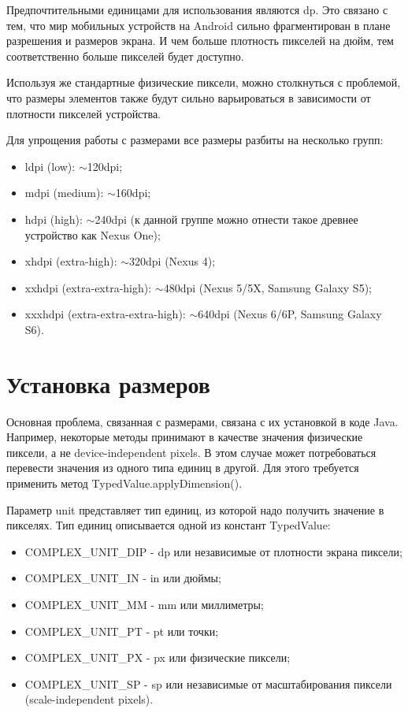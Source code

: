 Предпочтительными единицами для использования являются dp. Это связано
с тем, что мир мобильных устройств на Android сильно фрагментирован в
плане разрешения и размеров экрана. И чем больше плотность пикселей на
дюйм, тем соответственно больше пикселей будет доступно.\par
Используя же стандартные физические пиксели, можно столкнуться с
проблемой, что размеры элементов также будут сильно варьироваться в
зависимости от плотности пикселей устройства.\par
Для упрощения работы с размерами все размеры разбиты на несколько
групп:
\begin{itemize}
	\item ldpi (low): $\sim$120dpi;
	\item mdpi (medium): $\sim$160dpi;
	\item hdpi (high):
		$\sim$240dpi (к данной группе можно отнести такое древнее
		устройство как Nexus One);
	\item xhdpi (extra-high): $\sim$320dpi (Nexus 4);
	\item xxhdpi (extra-extra-high):
		$\sim$480dpi (Nexus 5/5X, Samsung Galaxy S5);
	\item xxxhdpi (extra-extra-extra-high):
		$\sim$640dpi (Nexus 6/6P, Samsung Galaxy S6).
\end{itemize}

\section{Установка размеров}
Основная проблема, связанная с размерами, связана с их установкой в коде
Java. Например, некоторые методы принимают в качестве значения
физические пиксели, а не device-independent pixels. В этом случае может
потребоваться перевести значения из одного типа единиц в другой. Для этого
требуется применить метод TypedValue.applyDimension().\par
Параметр unit представляет тип единиц, из которой надо получить значение в
пикселях. Тип единиц описывается одной из констант TypedValue:
\begin{itemize}
	\item COMPLEX\_UNIT\_DIP - dp или независимые от плотности экрана пиксели;
	\item COMPLEX\_UNIT\_IN - in или дюймы;
	\item COMPLEX\_UNIT\_MM - mm или миллиметры;
	\item COMPLEX\_UNIT\_PT - pt или точки;
	\item COMPLEX\_UNIT\_PX - px или физические пиксели;
	\item COMPLEX\_UNIT\_SP - sp или независимые от масштабирования
		пиксели (scale-independent pixels).
\end{itemize}

